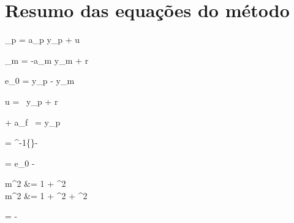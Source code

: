 ﻿%
\section{Resumo das equações do método}


\vspace{20mm}

\noindent

  {_p = a_p y_p + u \label{eq:planta}}

  {_m = -a_m y_m + r \label{eq:ref_model}}

  {e_0 = y_p - y_m \label{eq:error}}

  {u = \theta \, y_p + r \label{eq:ctrl_law}}

  {\dot{\zeta} + a_f \, \zeta = y_p \label{eq:filter}}

  { = ^{-1}\left\{\right\}- \theta\zeta \label{eq:est_error}}

  {\varepsilon = e_0 -  \label{eq:error_est}}

  {m^2 &= 1 + \zeta^2 \\ m^2 &= 1 + \zeta^2 + \dot{\zeta}^2 \label{eq:norm_signal}}

  {\dot{\theta} = -  \label{eq:adpt_law}}

